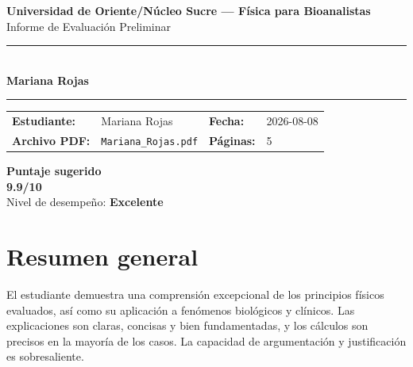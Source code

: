\documentclass[11pt,a4paper]{article}
\begin{document}
\begin{center}
  {\Large\bfseries\color{azulTitulo} Universidad de Oriente/Núcleo Sucre --- Física para Bioanalistas}\\[4pt]
  {\large Informe de Evaluación Preliminar}\\[12pt]
  \rule{\linewidth}{1.2pt}\\[6pt]
  {\LARGE\bfseries Mariana Rojas}\\[4pt]
  \rule{\linewidth}{0.6pt}
\end{center}

\vspace{4pt}
\begin{tcolorbox}[cajaTitulo, title=Datos del informe]
\begin{tabular}{@{}llll@{}}
  \textbf{Estudiante:}  & Mariana Rojas  &
  \textbf{Fecha:}       & 2026-08-08 \\[4pt]
  \textbf{Archivo PDF:} & \texttt{Mariana\_Rojas.pdf}  &
  \textbf{Páginas:}     & 5 \\
\end{tabular}
\end{tcolorbox}

\vspace{6pt}
\begin{center}
  \begin{tcolorbox}[
    enhanced,
    colback=white, colframe=desempeno_excelente,
    width=0.62\linewidth,
    boxrule=2pt,
    halign=center, valign=center,
    top=8pt, bottom=8pt,
  ]
    \centering
    {\large\bfseries Puntaje sugerido}\\[6pt]
    {\Huge\bfseries\color{desempeno_excelente} 9.9/10}\\[6pt]
    {\large Nivel de desempeño: \textbf{\color{desempeno_excelente} Excelente}}
  \end{tcolorbox}
\end{center}

\section*{Resumen general}
El estudiante demuestra una comprensión excepcional de los principios físicos evaluados, así como su aplicación a fenómenos biológicos y clínicos. Las explicaciones son claras, concisas y bien fundamentadas, y los cálculos son precisos en la mayoría de los casos. La capacidad de argumentación y justificación es sobresaliente.
\end{document}
